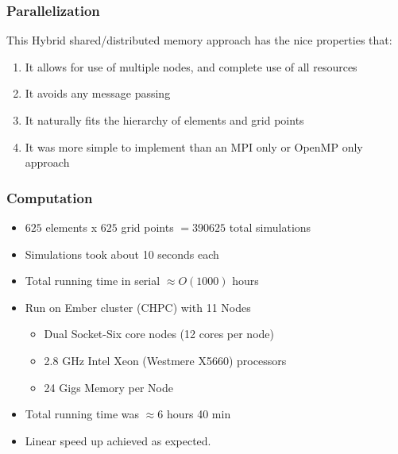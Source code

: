 \documentclass{beamer}
\theoremstyle{plain}
\theoremstyle{definition}
\begin{document}
\begin{frame}\frametitle{Parallelization}
  This Hybrid shared/distributed memory approach has the nice properties that:
  \begin{enumerate}
    \item It allows for use of multiple nodes, and complete use of all resources
    \item It avoids any message passing
    \item It naturally fits the hierarchy of elements and grid points
    \item It was more simple to implement than an MPI only or OpenMP only approach
  \end{enumerate}
\end{frame}

\begin{frame}\frametitle{Computation}
  \begin{itemize}
    \item $625$ elements x $625$ grid points $= 390625$ total simulations
    \item Simulations took about 10 seconds each
    \item Total running time in serial $\approx O(1000)$ hours
    \item Run on Ember cluster (CHPC) with 11 Nodes
    \begin{itemize}
      \item Dual Socket-Six core nodes (12 cores per node)
      \item 2.8 GHz Intel Xeon (Westmere X5660) processors
      \item 24 Gigs Memory per Node
    \end{itemize}
    \item Total running time was $\approx 6$ hours 40 min
    \item Linear speed up achieved as expected.
  \end{itemize}
\end{frame}
\end{document}
